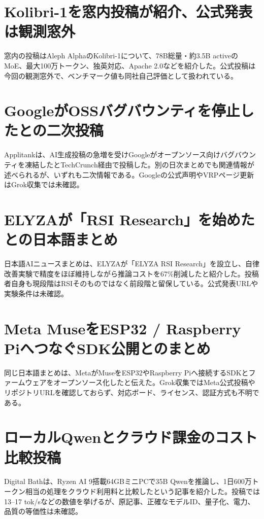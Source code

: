 \section{Kolibri-1を窓内投稿が紹介、公式発表は観測窓外}
窓内の投稿はAleph AlphaのKolibri-1について、78B総量・約3.5B activeのMoE、最大100万トークン、独英対応、Apache 2.0などを紹介した。公式投稿は今回の観測窓外で、ベンチマーク値も同社自己評価として扱われている。

\section{GoogleがOSSバグバウンティを停止したとの二次投稿}
Applitankは、AI生成投稿の急増を受けGoogleがオープンソース向けバグバウンティを凍結したとTechCrunch経由で投稿した。別の日次まとめでも関連情報が述べられるが、いずれも二次情報である。Googleの公式声明やVRPページ更新はGrok収集では未確認。

\section{ELYZAが「RSI Research」を始めたとの日本語まとめ}
日本語AIニュースまとめは、ELYZAが「ELYZA RSI Research」を設立し、自律改善実験で精度をほぼ維持しながら推論コストを67\%削減したと紹介した。投稿者自身も現段階はRSIそのものではなく前段階と留保している。公式発表URLや実験条件は未確認。

\section{Meta MuseをESP32 / Raspberry PiへつなぐSDK公開とのまとめ}
同じ日本語まとめは、MetaがMuseをESP32やRaspberry Piへ接続するSDKとファームウェアをオープンソース化したと伝えた。Grok収集ではMeta公式投稿やリポジトリURLを確認しておらず、対応ボード、ライセンス、認証方式も不明である。

\section{ローカルQwenとクラウド課金のコスト比較投稿}
Digital Bathは、Ryzen AI 9搭載64GBミニPCで35B Qwenを推論し、1日600万トークン相当の処理をクラウド利用料と比較したという記事を紹介した。投稿では13--17 tok/sなどの数値を挙げるが、原記事、正確なモデルID、量子化、電力、品質の等価性は未確認。

